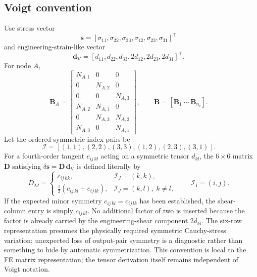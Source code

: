 \documentclass[11pt,a4paper]{article}
\newcommand{\vct}[1]{\mathbf{#1}}
\begin{document}
\subsection{Voigt convention}

Use stress vector
\begin{equation}
\vct{s}
=
[\sigma_{11},\sigma_{22},\sigma_{33},\sigma_{12},\sigma_{23},\sigma_{31}]^\top
\end{equation}
and engineering-strain-like vector
\begin{equation}
\vct{d}_{\mathrm V}
=
[d_{11},d_{22},d_{33},2d_{12},2d_{23},2d_{31}]^\top.
\end{equation}
For node $A$,
\begin{equation}
\vct{B}_A
=
\begin{bmatrix}
N_{A,1} & 0 & 0\\
0 & N_{A,2} & 0\\
0 & 0 & N_{A,3}\\
N_{A,2} & N_{A,1} & 0\\
0 & N_{A,3} & N_{A,2}\\
N_{A,3} & 0 & N_{A,1}
\end{bmatrix},
\qquad
\vct{B}=[\vct{B}_1\ \cdots\ \vct{B}_{n_e}].
\label{eq:Bmatrix}
\end{equation}
Let the ordered symmetric index pairs be
\begin{equation}
\mathcal I=[(1,1),(2,2),(3,3),(1,2),(2,3),(3,1)].
\end{equation}
For a fourth-order tangent $c_{ij\,kl}$ acting on a symmetric tensor $d_{kl}$, the $6\times6$ matrix $\vct D$ satisfying $\delta\vct s=\vct D\,\vct d_{\mathrm V}$ is defined literally by
\begin{equation}
D_{IJ}=
\begin{cases}
c_{ij\,kk}, & \mathcal I_J=(k,k),\\[1mm]
\tfrac12\left(c_{ij\,kl}+c_{ij\,lk}\right), & \mathcal I_J=(k,l),\;k\neq l,
\end{cases}
\qquad \mathcal I_I=(i,j).
\label{eq:voigt-explicit}
\end{equation}
If the expected minor symmetry $c_{ij\,kl}=c_{ij\,lk}$ has been established, the shear-column entry is simply $c_{ij\,kl}$. No additional factor of two is inserted because the factor is already carried by the engineering-shear component $2d_{kl}$. The six-row representation presumes the physically required symmetric Cauchy-stress variation; unexpected loss of output-pair symmetry is a diagnostic rather than something to hide by automatic symmetrization. This convention is local to the FE matrix representation; the tensor derivation itself remains independent of Voigt notation.
\end{document}
